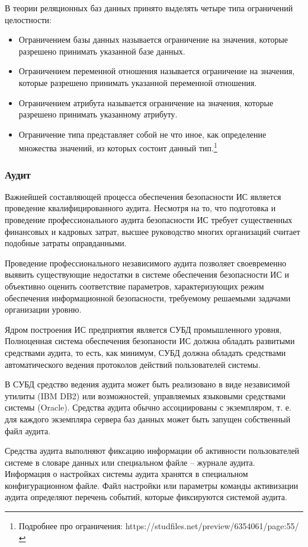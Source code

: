 В теории реляционных баз данных принято выделять четыре типа ограничений целостности:
\begin{itemize}
	\item Ограничением базы данных называется ограничение на значения, которые разрешено принимать указанной базе данных.
	\item Ограничением переменной отношения называется ограничение на значения, которые разрешено принимать указанной переменной отношения.
	\item Ограничением атрибута называется ограничение на значения, которые разрешено принимать указанному атрибуту.
	\item Ограничение типа представляет собой не что иное, как определение множества значений, из которых состоит данный тип.\footnote{Подробнее про ограничения: https://studfiles.net/preview/6354061/page:55/}
\end{itemize}

\subsubsection{Аудит}
Важнейшей составляющей процесса обеспечения безопасности ИС является проведение квалифицированного аудита. Несмотря на то, что подготовка и проведение профессионального аудита безопасности ИС требует существенных финансовых и кадровых затрат, высшее руководство многих организаций считает подобные затраты оправданными.

Проведение профессионального независимого аудита позволяет своевременно выявить существующие недостатки в системе обеспечения безопасности ИС и объективно оценить соответствие параметров, характеризующих режим обеспечения информационной безопасности, требуемому решаемыми задачами организации уровню.

Ядром построения ИС предприятия является СУБД промышленного уровня, Полноценная система обеспечения безопаности ИС должна обладать развитыми средствами аудита, то есть, как минимум, СУБД должна обладать средствами автоматического ведения протоколов действий пользователей системы.

В СУБД средство ведения аудита может быть реализовано в виде независимой утилиты (IBM DB2) или возможностей, управляемых языковыми средствами системы (Oracle). Средства аудита обычно ассоциированы с экземпляром, т. е. для каждого экземпляра сервера баз данных может быть запущен собственный файл аудита.

Средства аудита выполняют фиксацию информации об активности пользователей системе в словаре данных или специальном файле – журнале аудита. Информация о настройках системы аудита хранятся в специальном конфигурационном файле. Файл настройки или параметры команды активизации аудита определяют перечень событий, которые фиксируются системой аудита.


